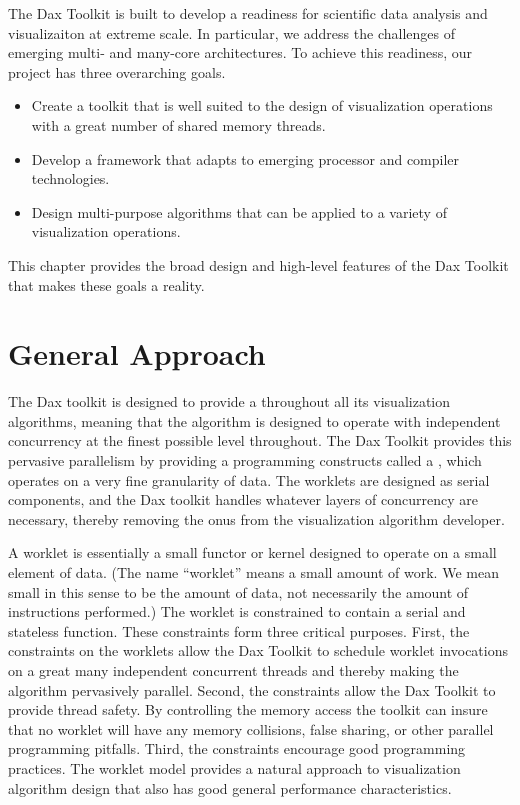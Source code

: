 
The Dax Toolkit is built to develop a readiness for scientific data
analysis and visualizaiton at extreme scale. In particular, we address the
challenges of emerging multi- and many-core architectures. To achieve this
readiness, our project has three overarching goals.

\begin{itemize}
\item Create a toolkit that is well suited to the design of visualization
  operations with a great number of shared memory threads.
\item Develop a framework that adapts to emerging processor and compiler
  technologies.
\item Design multi-purpose algorithms that can be applied to a variety of
  visualization operations.
\end{itemize}

This chapter provides the broad design and high-level features of the Dax
Toolkit that makes these goals a reality.

\section{General Approach}
\label{sec:GeneralApproach}

The Dax toolkit is designed to provide a 
 throughout all its visualization algorithms,
meaning that the algorithm is designed to operate with independent
concurrency at the finest possible level throughout. The Dax Toolkit
provides this pervasive parallelism by providing a programming constructs
called a ,  which operates on a very fine
granularity of data.  The worklets are designed as serial components, and
the Dax toolkit handles whatever layers of concurrency are necessary,
thereby removing the onus from the visualization algorithm developer.

A worklet is essentially a small functor  or kernel
 designed to operate on a small element of data. (The name
``worklet'' means a small amount of work. We mean small in this sense to be
the amount of data, not necessarily the amount of instructions performed.)
The worklet is constrained to contain a serial and stateless
function. These constraints form three critical purposes. First, the
constraints on the worklets allow the Dax Toolkit to schedule worklet
invocations on a great many independent concurrent threads and thereby
making the algorithm pervasively parallel. Second, the constraints allow
the Dax Toolkit to provide thread safety. By controlling the memory access
the toolkit can insure that no worklet will have any memory collisions,
false sharing, or other parallel programming pitfalls. Third, the
constraints encourage good programming practices. The worklet model
provides a natural approach to visualization algorithm design that also has
good general performance characteristics.

